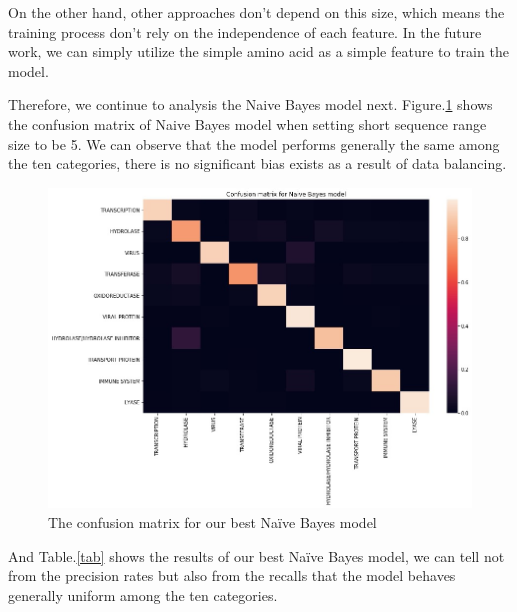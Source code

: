 \documentclass[sigconf]{acmart}
\begin{document}
On the other hand, other approaches don’t depend on this size, which means the training process don’t rely on the independence of each feature. In the future work, we can simply utilize the simple amino acid as a simple feature to train the model.

Therefore, we continue to analysis the Naive Bayes model next. Figure.\ref{5} shows the confusion matrix of Naive Bayes model when setting short sequence range size to be 5. We can observe that the model performs generally the same among the ten categories, there is no significant bias exists as a result of data balancing.

\begin{figure}[h]
  \centering
  \includegraphics[width=\linewidth]{5.jpeg}
  \caption{The confusion matrix for our best Naïve Bayes model}
  \label{5}
\end{figure}

And Table.\ref{tab} shows the results of our best Naïve Bayes model, we can tell not from the precision rates but also from the recalls that the model behaves generally uniform among the ten categories.
\end{document}
